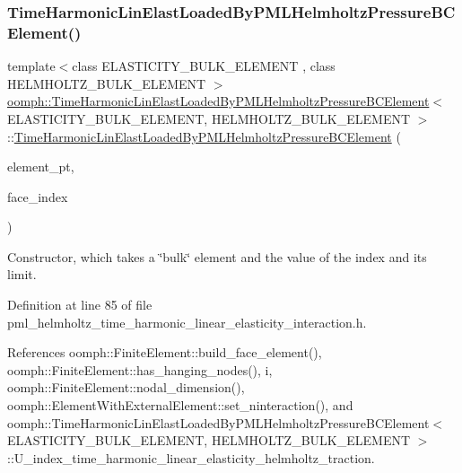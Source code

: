 \subsubsection{\texorpdfstring{Time\+Harmonic\+Lin\+Elast\+Loaded\+By\+P\+M\+L\+Helmholtz\+Pressure\+B\+C\+Element()}{TimeHarmonicLinElastLoadedByPMLHelmholtzPressureBCElement()}}
{\footnotesize\ttfamily template$<$class E\+L\+A\+S\+T\+I\+C\+I\+T\+Y\+\_\+\+B\+U\+L\+K\+\_\+\+E\+L\+E\+M\+E\+NT , class H\+E\+L\+M\+H\+O\+L\+T\+Z\+\_\+\+B\+U\+L\+K\+\_\+\+E\+L\+E\+M\+E\+NT $>$ \\
\hyperlink{classoomph_1_1TimeHarmonicLinElastLoadedByPMLHelmholtzPressureBCElement}{oomph\+::\+Time\+Harmonic\+Lin\+Elast\+Loaded\+By\+P\+M\+L\+Helmholtz\+Pressure\+B\+C\+Element}$<$ E\+L\+A\+S\+T\+I\+C\+I\+T\+Y\+\_\+\+B\+U\+L\+K\+\_\+\+E\+L\+E\+M\+E\+NT, H\+E\+L\+M\+H\+O\+L\+T\+Z\+\_\+\+B\+U\+L\+K\+\_\+\+E\+L\+E\+M\+E\+NT $>$\+::\hyperlink{classoomph_1_1TimeHarmonicLinElastLoadedByPMLHelmholtzPressureBCElement}{Time\+Harmonic\+Lin\+Elast\+Loaded\+By\+P\+M\+L\+Helmholtz\+Pressure\+B\+C\+Element} (\begin{DoxyParamCaption}\item[{\hyperlink{classoomph_1_1FiniteElement}{Finite\+Element} $\ast$const \&}]{element\+\_\+pt,  }\item[{const int \&}]{face\+\_\+index }\end{DoxyParamCaption})\hspace{0.3cm}{\ttfamily [inline]}}



Constructor, which takes a \char`\"{}bulk\char`\"{} element and the value of the index and its limit. 



Definition at line 85 of file pml\+\_\+helmholtz\+\_\+time\+\_\+harmonic\+\_\+linear\+\_\+elasticity\+\_\+interaction.\+h.



References oomph\+::\+Finite\+Element\+::build\+\_\+face\+\_\+element(), oomph\+::\+Finite\+Element\+::has\+\_\+hanging\+\_\+nodes(), i, oomph\+::\+Finite\+Element\+::nodal\+\_\+dimension(), oomph\+::\+Element\+With\+External\+Element\+::set\+\_\+ninteraction(), and oomph\+::\+Time\+Harmonic\+Lin\+Elast\+Loaded\+By\+P\+M\+L\+Helmholtz\+Pressure\+B\+C\+Element$<$ E\+L\+A\+S\+T\+I\+C\+I\+T\+Y\+\_\+\+B\+U\+L\+K\+\_\+\+E\+L\+E\+M\+E\+N\+T, H\+E\+L\+M\+H\+O\+L\+T\+Z\+\_\+\+B\+U\+L\+K\+\_\+\+E\+L\+E\+M\+E\+N\+T $>$\+::\+U\+\_\+index\+\_\+time\+\_\+harmonic\+\_\+linear\+\_\+elasticity\+\_\+helmholtz\+\_\+traction.



